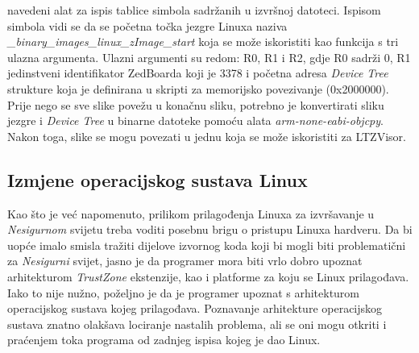 \documentclass[times, utf8, diplomski, numeric]{fer}
\begin{document}
navedeni alat za ispis tablice simbola sadržanih u izvršnoj datoteci. Ispisom simbola vidi se da se početna točka jezgre
Linuxa naziva \textit{\_binary\_images\_linux\_zImage\_start} koja se može iskoristiti kao funkcija s tri ulazna argumenta.
Ulazni argumenti su redom: R0, R1 i R2, gdje R0 sadrži 0, R1 jedinstveni identifikator ZedBoarda koji je 3378 i početna adresa
\textit{Device Tree} strukture koja je definirana u skripti za memorijsko povezivanje (0x2000000). Prije nego se sve slike
povežu u konačnu sliku, potrebno je konvertirati sliku jezgre i \textit{Device Tree} u binarne datoteke pomoću alata
\textit{arm-none-eabi-objcpy}. Nakon toga, slike se mogu povezati u jednu koja se može iskoristiti za LTZVisor.

\subsection{Izmjene operacijskog sustava Linux}
Kao što je već napomenuto, prilikom prilagođenja Linuxa za izvršavanje u \textit{Nesigurnom} svijetu treba voditi posebnu brigu o
pristupu Linuxa hardveru. Da bi uopće imalo smisla tražiti dijelove izvornog koda koji bi mogli biti problematični za
\textit{Nesigurni} svijet, jasno je da programer mora biti vrlo dobro upoznat arhitekturom \textit{TrustZone} ekstenzije, kao i
platforme za koju se Linux prilagođava. Iako to nije nužno, poželjno je da je programer upoznat s arhitekturom operacijskog
sustava kojeg prilagođava. Poznavanje arhitekture operacijskog sustava znatno olakšava lociranje nastalih problema, ali se
oni mogu otkriti i praćenjem toka programa od zadnjeg ispisa kojeg je dao Linux.
\end{document}
